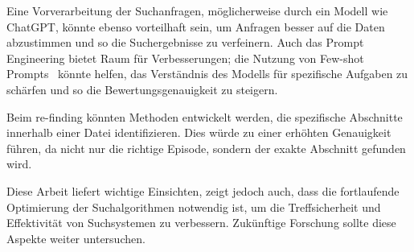 Eine Vorverarbeitung der Suchanfragen, möglicherweise durch ein Modell wie ChatGPT, könnte ebenso vorteilhaft sein, um Anfragen besser auf die Daten abzustimmen und so die Suchergebnisse zu verfeinern. 
Auch das Prompt Engineering bietet Raum für Verbesserungen; die Nutzung von Few-shot Prompts~\cite{brown2020} könnte helfen, das Verständnis des Modells für spezifische Aufgaben zu schärfen und so die Bewertungsgenauigkeit zu steigern.

Beim re-finding könnten Methoden entwickelt werden, die spezifische Abschnitte innerhalb einer Datei identifizieren. 
Dies würde zu einer erhöhten Genauigkeit führen, da nicht nur die richtige Episode, sondern der exakte Abschnitt gefunden wird.

Diese Arbeit liefert wichtige Einsichten, zeigt jedoch auch, dass die fortlaufende Optimierung der Suchalgorithmen notwendig ist, um die Treffsicherheit und Effektivität von Suchsystemen zu verbessern. 
Zukünftige Forschung sollte diese Aspekte weiter untersuchen.